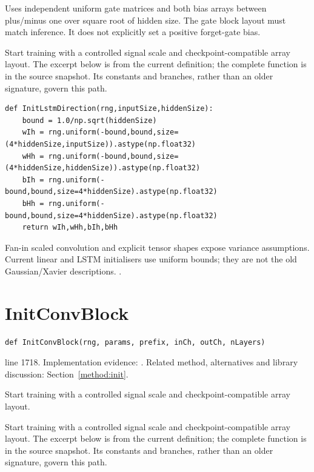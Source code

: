 Uses independent uniform gate matrices and both bias arrays between plus/minus one over square root of hidden size. The gate block layout must match inference. It does not explicitly set a positive forget-gate bias.


Start training with a controlled signal scale and checkpoint-compatible array layout. The excerpt below is from the current definition; the complete function is in the source snapshot. Its constants and branches, rather than an older signature, govern this path.


\begin{lstlisting}[style=plain]
def InitLstmDirection(rng,inputSize,hiddenSize):
    bound = 1.0/np.sqrt(hiddenSize)
    wIh = rng.uniform(-bound,bound,size=(4*hiddenSize,inputSize)).astype(np.float32)
    wHh = rng.uniform(-bound,bound,size=(4*hiddenSize,hiddenSize)).astype(np.float32)
    bIh = rng.uniform(-bound,bound,size=4*hiddenSize).astype(np.float32)
    bHh = rng.uniform(-bound,bound,size=4*hiddenSize).astype(np.float32)
    return wIh,wHh,bIh,bHh
\end{lstlisting}
Fan-in scaled convolution and explicit tensor shapes expose variance assumptions. Current linear and LSTM initialisers use uniform bounds; they are not the old Gaussian/Xavier descriptions. \cite{he2015,glorot2010,torchlstm,torchlinear}.


\section{InitConvBlock}\label{fn:train:InitConvBlock}
\begin{lstlisting}[style=sig]
def InitConvBlock(rng, params, prefix, inCh, outCh, nLayers)
\end{lstlisting}
 line 1718. Implementation evidence: \cite{code2026}. Related method, alternatives and library discussion: Section~\ref{method:init}.


Start training with a controlled signal scale and checkpoint-compatible array layout.


Start training with a controlled signal scale and checkpoint-compatible array layout. The excerpt below is from the current definition; the complete function is in the source snapshot. Its constants and branches, rather than an older signature, govern this path.


